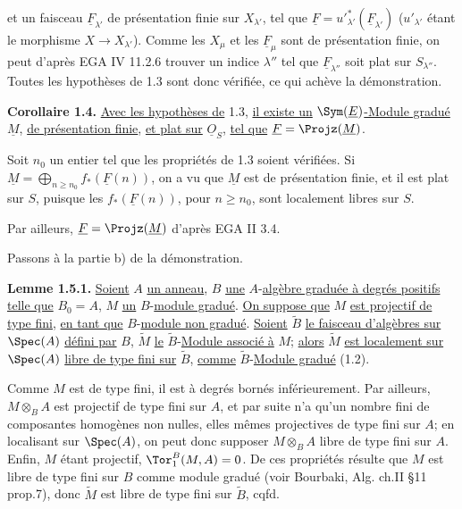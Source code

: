 
et un faisceau \(\underline{F}_{\lambda'}\) de présentation finie sur \(X_{\lambda'}\), tel que \(\underline{F}=u'^*_{\lambda'}(\underline{F}_{\lambda'})\) (\(u'_{\lambda'}\) étant le morphisme \(X\to X_{\lambda'}\)). Comme les \(X_\mu\) et les \(\underline{F}_\mu\) sont de présentation finie, on peut d'après EGA IV 11.2.6 trouver un indice \(\lambda''\) tel que \(\underline{F}_{\lambda''}\) soit plat sur \(S_{\lambda''}\). Toutes les hypothèses de 1.3 sont donc vérifiée, ce qui achève la démonstration.

\textbf{Corollaire 1.4.} \uline{Avec les hypothèses de} 1.3, \uline{il existe un} \(\Sym(\underline{E})\)\uline{-Module gradué} \(\underline{M}\), \uline{de présentation finie}, \uline{et plat sur} \(\underline{O}_S\), \uline{tel que} \(\underline{F}=\Projz(\underline{M})\).

Soit \(n_0\) un entier tel que les propriétés de 1.3 soient vérifiées. Si \(\underline{M}=\bigoplus_{n\geq n_0} f_*(\underline{F}(n))\), on a vu que \(\underline{M}\) est de présentation finie, et il est plat sur \(S\), puisque les \(f_*(\underline{F}(n))\), pour \(n\geq n_0\), sont localement libres sur \(S\).

Par ailleurs, \(\underline{F}=\Projz(\underline{M})\) d'après EGA II 3.4.

Passons à la partie b) de la démonstration.

\textbf{Lemme 1.5.1.} \uline{Soient} \(A\) \uline{un anneau}, \(B\) \uline{une} \(A\)-\uline{algèbre graduée à degrés positifs} \uline{telle que} \(B_0=A\), \(M\) \uline{un} \(B\)-\uline{module gradué}. \uline{On suppose que} \(M\) \uline{est projectif de type fini}, \uline{en tant que} \(B\)-\uline{module non gradué}. \uline{Soient} \(\widetilde B\) \uline{le faisceau d'algèbres sur} \(\Spec(A)\) \uline{défini par} \(B\), \(\widetilde M\) \uline{le} \(\widetilde B\)-\uline{Module associé à} \(M\); \uline{alors} \(\widetilde M\) \uline{est localement sur} \(\Spec(A)\) \uline{libre de type fini sur} \(\widetilde B\), \uline{comme} \(\widetilde B\)-\uline{Module gradué} (1.2).

Comme \(M\) est de type fini, il est à degrés bornés inférieurement. Par ailleurs, \(M\otimes_B A\) est projectif de type fini sur \(A\), et par suite n'a qu'un nombre fini de composantes homogènes non nulles, elles mêmes projectives de type fini sur \(A\); en localisant sur \(\Spec(A)\), on peut donc supposer \(M\otimes_B A\) libre de type fini sur \(A\). Enfin, \(M\) étant projectif, \(\Tor_1^B(M,A)=0\). De ces propriétés résulte que \(M\) est libre de type fini sur \(B\) comme module gradué (voir Bourbaki, Alg. ch.II §11 prop.7), donc \(\widetilde M\) est libre de type fini sur \(\widetilde B\), cqfd.

